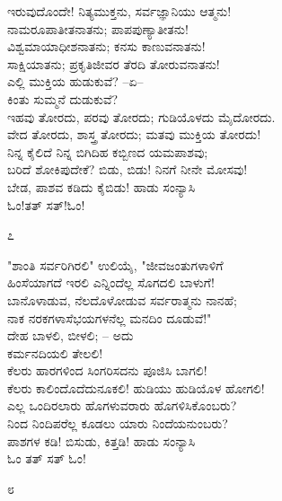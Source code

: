 \begin{myquote}
ಇರುವುದೊಂದೇ! ನಿತ್ಯಮುಕ್ತನು, ಸರ್ವಜ್ಞಾನಿಯು ಆತ್ಮನು!\\ನಾಮರೂಪಾತೀತನಾತನು; ಪಾಪಪುಣ್ಯಾತೀತನು!\\ವಿಶ್ವಮಾಯಾಧೀಶನಾತನು; ಕನಸು ಕಾಣುವನಾತನು!\\ಸಾಕ್ಷಿಯಾತನು; ಪ್ರಕೃತಿಜೀವರ ತೆರದಿ ತೋರುವನಾತನು!\\ಎಲ್ಲಿ ಮುಕ್ತಿಯ ಹುಡುಕುವೆ? –ಏ–\\ಕಿಂತು ಸುಮ್ಮನೆ ದುಡುಕುವೆ?\\ಇಹವು ತೋರದು, ಪರವು ತೋರದು; ಗುಡಿಯೊಳದು ಮೈದೋರದು.\\ವೇದ ತೋರದು, ಶಾಸ್ತ್ರ ತೋರದು; ಮತವು ಮುಕ್ತಿಯ ತೋರದು!\\ನಿನ್ನ ಕೈಲಿದೆ ನಿನ್ನ ಬಿಗಿದಿಹ ಕಬ್ಬಿಣದ ಯಮಪಾಶವು;\\ಬರಿದೆ ಶೋಕಿಪುದೇಕೆ? ಬಿಡು, ಬಿಡು! ನಿನಗೆ ನೀನೇ ಮೋಸವು!\\ಬೇಡ, ಪಾಶವ ಕಡಿದು ಕೈಬಿಡು! ಹಾಡು ಸಂನ್ಯಾಸಿ\\ಓಂ!ತತ್ ಸತ್!ಓಂ!
\end{myquote}

\begin{center}
೭
\end{center}

\begin{myquote}
"ಶಾಂತಿ ಸರ್ವರಿಗಿರಲಿ" ಉಲಿಯೈ, "ಜೀವಜಂತುಗಳಾಳಿಗೆ\\ಹಿಂಸೆಯಾಗದೆ ಇರಲಿ ಎನ್ನಿಂದೆಲ್ಲ ಸೊಗದಲಿ ಬಾಳುಗೆ!\\ಬಾನೊಳಾಡುವ, ನೆಲದೊಳೋಡುವ ಸರ್ವರಾತ್ಮನು ನಾನಹೆ;\\ನಾಕ ನರಕಗಳಾಸೆಭಯಗಳನೆಲ್ಲ ಮನದಿಂ ದೂಡುವೆ!"\\ದೇಹ ಬಾಳಲಿ, ಬೀಳಲಿ; – ಅದು\\ಕರ್ಮನದಿಯಲಿ ತೇಲಲಿ!\\ಕೆಲರು ಹಾರಗಳಿಂದ ಸಿಂಗರಿಸದನು ಪೂಜಿಸಿ ಬಾಗಲಿ!\\ಕೆಲರು ಕಾಲಿಂದೊದೆದುನೂಕಲಿ! ಹುಡಿಯು ಹುಡಿಯೊಳ ಹೋಗಲಿ!\\ಎಲ್ಲ ಒಂದಿರಲಾರು ಹೊಗಳುವರಾರು ಹೊಗಳಿಸಿಕೊಂಬರು?\\ನಿಂದ ನಿಂದಿಪರೆಲ್ಲ ಕೂಡಲು ಯಾರು ನಿಂದೆಯನುಂಬರು?\\ಪಾಶಗಳ ಕಡಿ! ಬಿಸುಡು, ಕಿತ್ತಡಿ! ಹಾಡು ಸಂನ್ಯಾಸಿ\\ಓಂ ತತ್ ಸತ್ ಓಂ!
\end{myquote}

\begin{center}
೮
\end{center}

